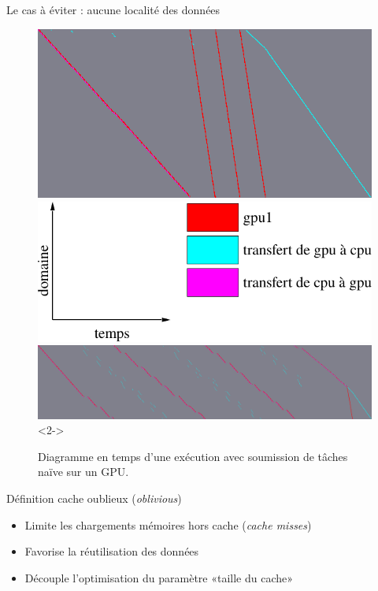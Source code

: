 \documentclass[9pt]{beamer}
\begin{document}
\begin{frame}{\textcolor{inriaGrey}{Le cas à éviter : aucune localité des données}}
  \begin{figure}
    \centering
    \hspace*{\fill}
    \includegraphics[width=0.45\linewidth]{img/worst-nolimit.png}
    \hspace*{\fill}
    \includegraphics[width=0.55\linewidth]{img/xpm-legend-gpu1.pdf}
    \hspace*{\fill}
    \newline \vfill
    \includegraphics[width=1\linewidth]{img/worst-limit.png}<2->
    \vfill
    \caption{Diagramme en temps d'une exécution avec soumission de tâches naïve
      sur un GPU.}
  \end{figure}
\end{frame}

\begin{frame}{\textcolor{inriaGrey}{Définition cache oublieux (\textit{oblivious})}}
  \vfill
  \begin{itemize}
  \item<2-> Limite les chargements mémoires hors cache (\textit{cache misses})
  \vfill
  \item<3-> Favorise la réutilisation des données
  \vfill
  \item<4-> Découple l'optimisation du paramètre «taille du cache»
  \end{itemize}
  \vfill
\end{frame}
\end{document}
